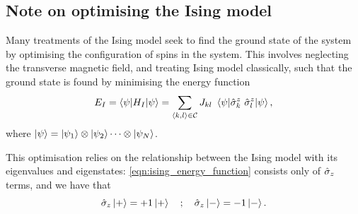 \par 
\subsection{Note on optimising the Ising model}\label{sec:ising_optimisation}
Many treatments of the Ising model seek to find the ground state
    of the system by optimising the configuration of spins in the system. 
This involves neglecting the transverse magnetic field, and treating Ising model classically, 
    such that the ground state is found by minimising the energy function
\begin{equation}
    \label{eqn:ising_energy_function}
    E_I = \braket{\psi | H_I | \psi} = 
    \sum_{{ \langle k, l \rangle } \in \mathcal{C}} J_{kl}  \ \braket{ \psi |  \hat{\sigma}_k^z \ \hat{\sigma}_{l}^z | \psi }, 
\end{equation}
    where $\ket{\psi} = \ket{\psi_1} \otimes \ket{\psi_2} \dots \otimes \ket{\psi_N}$. 

This optimisation relies on the relationship between the Ising model with its eigenvalues and eigenstates:
    \cref{eqn:ising_energy_function} consists only of $\hat{\sigma}_{z}$ terms, and we have that 
\begin{equation}
    \sz \ket{+} = +1 \ket{+} \ \ \ ; \ \ \ 
    \sz \ket{-} = -1 \ket{-}. 
\end{equation}


